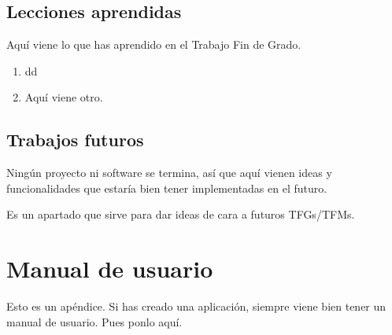 \documentclass[a4paper, 12pt]{book}
\begin{document}
\section{Lecciones aprendidas}
\label{sec:lecciones_aprendidas}

Aquí viene lo que has aprendido en el Trabajo Fin de Grado.

\begin{enumerate}
  \item dd
  \item Aquí viene otro.
\end{enumerate}


\section{Trabajos futuros}
\label{sec:trabajos_futuros}

Ningún proyecto ni software se termina, así que aquí vienen ideas y funcionalidades que estaría bien tener implementadas en el futuro.

Es un apartado que sirve para dar ideas de cara a futuros TFGs/TFMs.



\cleardoublepage
\appendix
\chapter{Manual de usuario}
\label{app:manual}

Esto es un apéndice.
Si has creado una aplicación, siempre viene bien tener un manual de usuario.
Pues ponlo aquí.


\cleardoublepage


\end{document}
